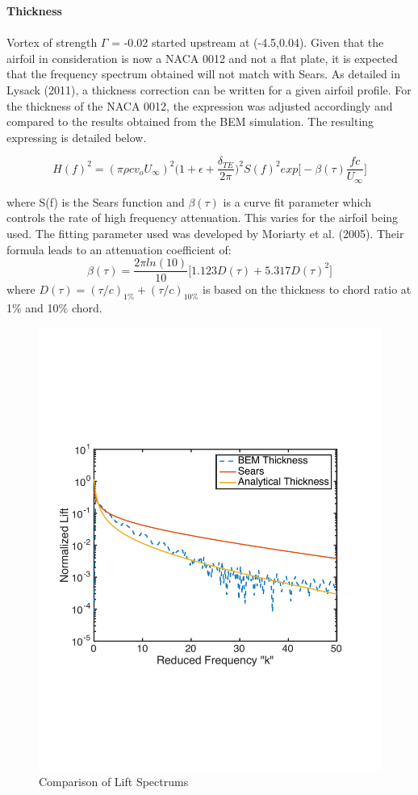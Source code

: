 \documentclass{article}
\begin{document}
\noindent \textbf{Thickness} \\ \\
Vortex of strength $\Gamma$ = -0.02 started upstream at (-4.5,0.04). Given that the airfoil in consideration is now a NACA 0012 and not a flat plate, it is expected that the frequency spectrum obtained will not match with Sears. As detailed in Lysack (2011), a thickness correction can be written for a given airfoil profile. For the thickness of the NACA 0012, the expression was adjusted accordingly and compared to the results obtained from the BEM simulation. The resulting expressing is detailed below. 

\begin{equation}
H(f)^2 = (\pi \rho c v_o U_{\infty})^2\Bigg(1 + \epsilon + \frac{\delta_{TE}}{2\pi} \Bigg )^2 S(f)^2 exp\Bigg[-\beta(\tau)\frac{fc}{U_{\infty}}\Bigg]
\end{equation}

\noindent where S(f) is the Sears function and $\beta(\tau)$ is a curve fit parameter which controls the rate of high frequency attenuation. This varies for the airfoil being used. The fitting parameter used was developed by Moriarty et al. (2005). Their formula leads to an attenuation coefficient of: 
\begin{equation}
\beta(\tau) = \frac{2\pi ln(10)}{10} \big[1.123D(\tau) + 5.317D(\tau)^2 \big]
\end{equation}
where $D(\tau) = (\tau/c)_{1\%} + (\tau/c)_{10\%}$ is based on the thickness to chord ratio at 1$\%$ and 10$\%$ chord. 

\begin{figure}[h]
\includegraphics[width = 4 in, height = 3 in]{BEM_Compare}
\centering
\caption{Comparison of Lift Spectrums}
\end{figure}
\end{document}
